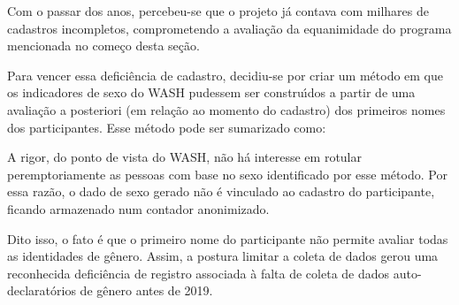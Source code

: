 \documentclass[
12pt,		%
openright,	%
twoside,  %
a4paper,			%
chapter=TITLE,		%
english,			%
french,				%
spanish,			%
brazil				%
]{USPSC-classe/USPSC}
\begin{document}
Com o passar dos anos, percebeu-se que o projeto j\'a contava com milhares de cadastros incompletos, comprometendo a avalia\c{c}\~ao da  equanimidade do programa mencionada no come\c{c}o desta se\c{c}\~ao.








Para vencer essa defici\^encia de cadastro, decidiu-se por criar um m\'etodo em que os indicadores de sexo do WASH pudessem ser constru\'{\i}dos a partir de uma avalia\c{c}\~ao a posteriori (em rela\c{c}\~ao ao momento do cadastro) dos primeiros nomes dos participantes. Esse m\'etodo pode ser sumarizado como:









\noindent\begin{center}\mbox{\centering{}}\end{center}


A rigor, do ponto de vista do WASH, n\~ao h\'a interesse em rotular peremptoriamente as pessoas com base no sexo identificado por esse m\'etodo. Por essa raz\~ao, o dado de sexo gerado n\~ao \'e vinculado ao cadastro do participante, ficando armazenado num contador anonimizado.








Dito isso, o fato \'e que o primeiro nome do participante n\~ao permite avaliar todas as identidades de g\^enero. Assim, a postura limitar a coleta de dados gerou uma reconhecida defici\^encia de registro associada \`a falta de coleta de dados auto-declarat\'orios de g\^enero antes de 2019.
\end{document}
